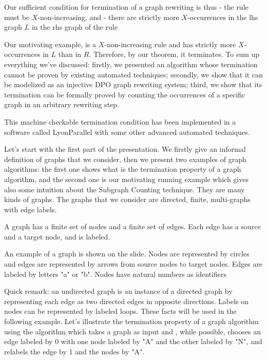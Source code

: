Our sufficient condition for termination of a graph rewriting is thus 
    - the rule must be $X$-non-increasing, and
    - there are strictly more $X$-occurrences in the lhs graph $L$ in the rhs graph of the rule

Our motivating example, is a $X$-non-increasing rule and has strictly more $X$-occurrences in $L$ than in $R$. Therefore, by our theorem, it terminates.
To sum up everything we've discussed:
    firstly, we presented an algorithm whose termination cannot be proven by existing automated techniques; 
    secondly, we show that it can be modelized as an injective DPO graph rewriting system;
    third, we show that its termination can be formally proved by counting the occurrences of a specific graph in an arbitrary rewriting step.

This machine checkable termination condition has been implemented in a software called LyonParallel with some other advanced automated techniques.






Let's start with the first part of the presentation.
We firstly give an informal definition of graphs that we consider, then we present two examples of graph algorithms: the first one shows what is the termination property of a graph algorithm, and the second one is our motivating running example which gives also some intuition about the Subgraph Counting technique.
They are many kinds of graphs. The graphs that we consider are directed, finite, multi-graphs with edge labels. 

A graph has a finite set of nodes and a finite set of edges. Each edge has a source and a target node, and is labeled.

An example of a graph is shown on the slide. Nodes are represented by circles and edges are represented by arrows from source nodes to target nodes. Edges are labeled by letters "a" or "b". 
Nodes have natural numbers as identifiers

Quick remark: an undirected graph is an instance of a directed graph by representing each edge as two directed edges in opposite directions. 
Labels on nodes can be represented by labeled loops. These facts will be used in the following example.
    Let's illustrate the termination property of a graph algorithm using the algorithm which takes a graph as input and
    , while possible, chooses an edge labeled by 0
    with one node labeled by "A" and the other labeled by "N", and relabels the edge by 1 and the nodes by "A".

